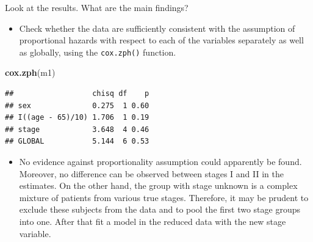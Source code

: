 \documentclass[
]{book}
\newenvironment{Shaded}{\begin{snugshade}}{\end{snugshade}}
\newcommand{\AttributeTok}[1]{\textcolor[rgb]{0.13,0.29,0.53}{#1}}
\newcommand{\DecValTok}[1]{\textcolor[rgb]{0.00,0.00,0.81}{#1}}
\newcommand{\FunctionTok}[1]{\textcolor[rgb]{0.13,0.29,0.53}{\textbf{#1}}}
\newcommand{\NormalTok}[1]{#1}
\newcommand{\OtherTok}[1]{\textcolor[rgb]{0.56,0.35,0.01}{#1}}
\newcommand{\SpecialCharTok}[1]{\textcolor[rgb]{0.81,0.36,0.00}{\textbf{#1}}}
\newcommand{\StringTok}[1]{\textcolor[rgb]{0.31,0.60,0.02}{#1}}
\providecommand{\tightlist}{%
  \setlength{\itemsep}{0pt}\setlength{\parskip}{0pt}}
\theoremstyle{definition}
\theoremstyle{definition}
\theoremstyle{definition}
\theoremstyle{definition}
\theoremstyle{remark}
\begin{document}
Look at the results. What are the main findings?

\begin{itemize}
\tightlist
\item
  Check whether the data are sufficiently consistent with the assumption
  of proportional hazards with respect to each of the variables
  separately as well as globally, using the \texttt{cox.zph()} function.
\end{itemize}

\begin{Shaded}
\begin{Highlighting}[]
\FunctionTok{cox.zph}\NormalTok{(m1)}
\end{Highlighting}
\end{Shaded}

\begin{verbatim}
##                  chisq df    p
## sex              0.275  1 0.60
## I((age - 65)/10) 1.706  1 0.19
## stage            3.648  4 0.46
## GLOBAL           5.144  6 0.53
\end{verbatim}

\begin{itemize}
\tightlist
\item
  No evidence against proportionality assumption could apparently be
  found. Moreover, no difference can be observed between stages I and II
  in the estimates. On the other hand, the group with stage unknown is a
  complex mixture of patients from various true stages. Therefore, it
  may be prudent to exclude these subjects from the data and to pool the
  first two stage groups into one. After that fit a model in the reduced
  data with the new stage variable.
\end{itemize}

\begin{Shaded}
\end{Shaded}
\end{document}
